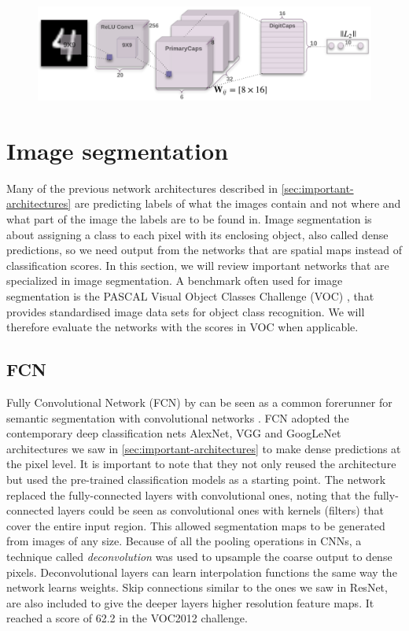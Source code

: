\begin{figure}[H]
	\centering
	\includegraphics[width=0.7\linewidth]{fig/capsnet.png}
	\label{fig:capsnet}
\end{figure}


\section{Image segmentation}
Many of the previous network architectures described in \autoref{sec:important-architectures} are predicting labels of what the images contain and not where and what part of the image the labels are to be found in. Image segmentation is about assigning a class to each pixel with its enclosing object, also called dense predictions, so we need output from the networks that are spatial maps instead of classification scores. In this section, we will review important networks that are specialized in image segmentation. A benchmark often used for image segmentation is the PASCAL Visual Object Classes Challenge (VOC) \cite{Everingham2010}, that provides standardised image data sets for object class recognition. We will therefore evaluate the networks with the scores in VOC when applicable.


\subsection{FCN}
Fully Convolutional Network (FCN) by \citet{Long2014} can be seen as a common forerunner for semantic segmentation with convolutional networks \citet{Garcia-Garcia2017}. FCN adopted the contemporary deep classification nets AlexNet, VGG and GoogLeNet architectures we saw in \autoref{sec:important-architectures} to make dense predictions at the pixel level. It is important to note that they not only reused the architecture but used the pre-trained classification models as a starting point. The network replaced the fully-connected layers with convolutional ones, noting that the fully-connected layers could be seen as convolutional ones with kernels (filters) that cover the entire input region. This allowed segmentation maps to be generated from images of any size. Because of all the pooling operations in CNNs, a technique called \emph{deconvolution} \citet{Zeiler2011} was used to upsample the coarse output to dense pixels. Deconvolutional layers can learn interpolation functions the same way the network learns weights. Skip connections similar to the ones we saw in ResNet, are also included to give the deeper layers higher resolution feature maps. It reached a score of 62.2 in the VOC2012 challenge. 


